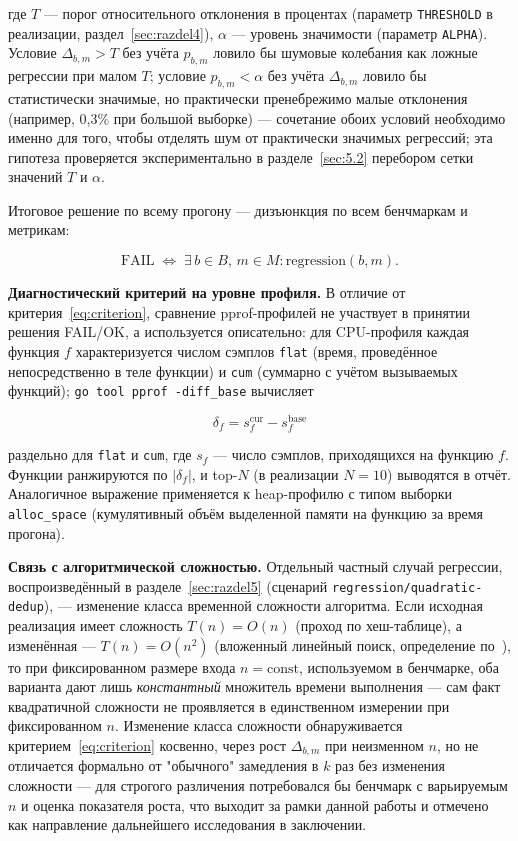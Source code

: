 \documentclass[12pt,a4paper]{article}
\numberwithin{equation}{section}
\begin{document}
где $T$ — порог относительного отклонения в процентах (параметр
\texttt{THRESHOLD} в реализации, раздел~\ref{sec:razdel4}), $\alpha$ —
уровень значимости (параметр \texttt{ALPHA}). Условие $\Delta_{b,m} > T$
без учёта $p_{b,m}$ ловило бы шумовые колебания как ложные регрессии при
малом $T$; условие $p_{b,m} < \alpha$ без учёта $\Delta_{b,m}$ ловило бы
статистически значимые, но практически пренебрежимо малые отклонения
(например, 0,3\% при большой выборке) — сочетание обоих условий необходимо
именно для того, чтобы отделять шум от практически значимых регрессий; эта
гипотеза проверяется экспериментально в разделе~\ref{sec:5.2} перебором
сетки значений $T$ и $\alpha$.

Итоговое решение по всему прогону — дизъюнкция по всем бенчмаркам и
метрикам:

\begin{equation}
\mathrm{FAIL} \;\Longleftrightarrow\; \exists\, b \in B,\, m \in M : \mathrm{regression}(b, m).
\label{eq:fail}
\end{equation}

\textbf{Диагностический критерий на уровне профиля.} В отличие от
критерия~\eqref{eq:criterion}, сравнение pprof-профилей не участвует в
принятии решения FAIL/OK, а используется описательно: для CPU-профиля
каждая функция $f$ характеризуется числом сэмплов \texttt{flat} (время,
проведённое непосредственно в теле функции) и \texttt{cum} (суммарно с
учётом вызываемых функций); \texttt{go tool pprof -diff\_base} вычисляет

\begin{equation}
\delta_f = s_f^{\text{cur}} - s_f^{\text{base}}
\label{eq:profdiff}
\end{equation}

раздельно для \texttt{flat} и \texttt{cum}, где $s_f$ — число сэмплов,
приходящихся на функцию $f$. Функции ранжируются по $|\delta_f|$, и top-$N$
(в реализации $N=10$) выводятся в отчёт. Аналогичное выражение применяется
к heap-профилю с типом выборки \texttt{alloc\_space} (кумулятивный объём
выделенной памяти на функцию за время прогона).

\textbf{Связь с алгоритмической сложностью.} Отдельный частный случай
регрессии, воспроизведённый в разделе~\ref{sec:razdel5} (сценарий
\texttt{regression/\allowbreak quadratic-dedup}), — изменение класса временной
сложности алгоритма. Если исходная реализация имеет сложность $T(n) = O(n)$
(проход по хеш-таблице), а изменённая — $T(n) = O(n^2)$ (вложенный линейный
поиск, определение по~\cite{clrs}), то при фиксированном размере входа
$n=\text{const}$, используемом в бенчмарке, оба варианта дают лишь
\emph{константный} множитель времени выполнения — сам факт квадратичной
сложности не проявляется в единственном измерении при фиксированном $n$.
Изменение класса сложности обнаруживается критерием~\eqref{eq:criterion}
косвенно, через рост $\Delta_{b,m}$ при неизменном $n$, но не отличается
формально от "обычного" замедления в $k$ раз без изменения сложности — для
строгого различения потребовался бы бенчмарк с варьируемым $n$ и оценка
показателя роста, что выходит за рамки данной работы и отмечено как
направление дальнейшего исследования в заключении.
\end{document}
